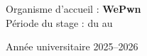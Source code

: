 \begin{titlepage}
\begin{center}
  \vspace{1.1cm}
  {\color{gris}Organisme d'accueil :} \textbf{WePwn}\\[0.15cm]
  {\color{gris}Période du stage :} du \datedebut{} au \datefin
\end{center}

\vfill
\noindent{\color{wepwn}\rule{\linewidth}{1.2pt}}
\begin{center}
  {\large Année universitaire 2025--2026}
\end{center}
\restoregeometry
\end{titlepage}
